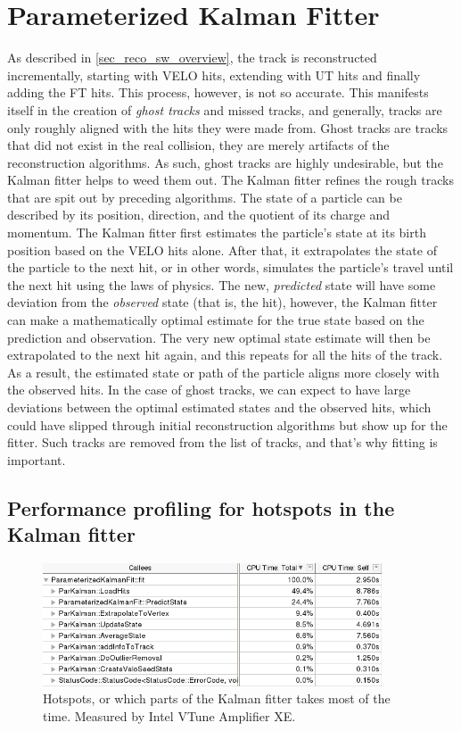 \documentclass[12pt]{article}
\begin{document}
\section{Parameterized Kalman Fitter}\label{sec_kalman_main}

As described in \ref{sec_reco_sw_overview}, the track is reconstructed incrementally, starting with VELO hits, extending with UT hits and finally adding the FT hits. This process, however, is not so accurate. This manifests itself in the creation of \textit{ghost tracks} and missed tracks, and generally, tracks are only roughly aligned with the hits they were made from. Ghost tracks are tracks that did not exist in the real collision, they are merely artifacts of the reconstruction algorithms. As such, ghost tracks are highly undesirable, but the Kalman fitter helps to weed them out. 
The Kalman fitter refines the rough tracks that are spit out by preceding algorithms. The state of a particle can be described by its position, direction, and the quotient of its charge and momentum. The Kalman fitter first estimates the particle's state at its birth position based on the VELO hits alone. After that, it extrapolates the state of the particle to the next hit, or in other words, simulates the particle's travel until the next hit using the laws of physics. The new, \textit{predicted} state will have some deviation from the \textit{observed} state (that is, the hit), however, the Kalman fitter can make a mathematically optimal estimate for the true state based on the prediction and observation. The very new optimal state estimate will then be extrapolated to the next hit again, and this repeats for all the hits of the track.
As a result, the estimated state or path of the particle aligns more closely with the observed hits. In the case of ghost tracks, we can expect to have large deviations between the optimal estimated states and the observed hits, which could have slipped through initial reconstruction algorithms but show up for the fitter. Such tracks are removed from the list of tracks, and that's why fitting is important.


\subsection{Performance profiling for hotspots in the Kalman fitter}

\begin{figure}[H]
	\begin{center}
		\includegraphics[width=0.9\textwidth]{kalmanfit_overall_breakdown}
	\end{center}
	\caption[CPU hotspots in the Kalman fitter]{Hotspots, or which parts of the Kalman fitter takes most of the time. Measured by Intel VTune Amplifier XE.}
	\label{fig_kalman_vtune_initial}
\end{figure}
\end{document}
